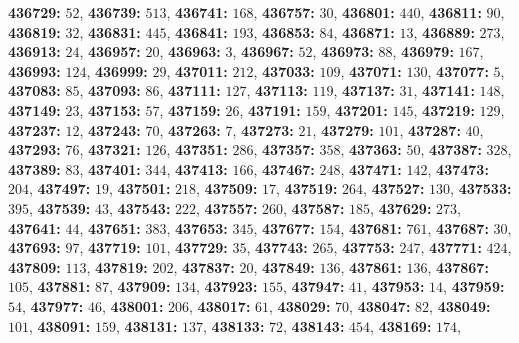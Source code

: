 \textsf{\bfseries 436729:} $52$, \textsf{\bfseries 436739:} $513$, \textsf{\bfseries 436741:} $168$, \textsf{\bfseries 436757:} $30$, \textsf{\bfseries 436801:} $440$, \textsf{\bfseries 436811:} $90$, \textsf{\bfseries 436819:} $32$, \textsf{\bfseries 436831:} $445$, \textsf{\bfseries 436841:} $193$, \textsf{\bfseries 436853:} $84$, \textsf{\bfseries 436871:} $13$, \textsf{\bfseries 436889:} $273$, \textsf{\bfseries 436913:} $24$, \textsf{\bfseries 436957:} $20$, \textsf{\bfseries 436963:} $3$, \textsf{\bfseries 436967:} $52$, \textsf{\bfseries 436973:} $88$, \textsf{\bfseries 436979:} $167$, \textsf{\bfseries 436993:} $124$, \textsf{\bfseries 436999:} $29$, \textsf{\bfseries 437011:} $212$, \textsf{\bfseries 437033:} $109$, \textsf{\bfseries 437071:} $130$, \textsf{\bfseries 437077:} $5$, \textsf{\bfseries 437083:} $85$, \textsf{\bfseries 437093:} $86$, \textsf{\bfseries 437111:} $127$, \textsf{\bfseries 437113:} $119$, \textsf{\bfseries 437137:} $31$, \textsf{\bfseries 437141:} $148$, \textsf{\bfseries 437149:} $23$, \textsf{\bfseries 437153:} $57$, \textsf{\bfseries 437159:} $26$, \textsf{\bfseries 437191:} $159$, \textsf{\bfseries 437201:} $145$, \textsf{\bfseries 437219:} $129$, \textsf{\bfseries 437237:} $12$, \textsf{\bfseries 437243:} $70$, \textsf{\bfseries 437263:} $7$, \textsf{\bfseries 437273:} $21$, \textsf{\bfseries 437279:} $101$, \textsf{\bfseries 437287:} $40$, \textsf{\bfseries 437293:} $76$, \textsf{\bfseries 437321:} $126$, \textsf{\bfseries 437351:} $286$, \textsf{\bfseries 437357:} $358$, \textsf{\bfseries 437363:} $50$, \textsf{\bfseries 437387:} $328$, \textsf{\bfseries 437389:} $83$, \textsf{\bfseries 437401:} $344$, \textsf{\bfseries 437413:} $166$, \textsf{\bfseries 437467:} $248$, \textsf{\bfseries 437471:} $142$, \textsf{\bfseries 437473:} $204$, \textsf{\bfseries 437497:} $19$, \textsf{\bfseries 437501:} $218$, \textsf{\bfseries 437509:} $17$, \textsf{\bfseries 437519:} $264$, \textsf{\bfseries 437527:} $130$, \textsf{\bfseries 437533:} $395$, \textsf{\bfseries 437539:} $43$, \textsf{\bfseries 437543:} $222$, \textsf{\bfseries 437557:} $260$, \textsf{\bfseries 437587:} $185$, \textsf{\bfseries 437629:} $273$, \textsf{\bfseries 437641:} $44$, \textsf{\bfseries 437651:} $383$, \textsf{\bfseries 437653:} $345$, \textsf{\bfseries 437677:} $154$, \textsf{\bfseries 437681:} $761$, \textsf{\bfseries 437687:} $30$, \textsf{\bfseries 437693:} $97$, \textsf{\bfseries 437719:} $101$, \textsf{\bfseries 437729:} $35$, \textsf{\bfseries 437743:} $265$, \textsf{\bfseries 437753:} $247$, \textsf{\bfseries 437771:} $424$, \textsf{\bfseries 437809:} $113$, \textsf{\bfseries 437819:} $202$, \textsf{\bfseries 437837:} $20$, \textsf{\bfseries 437849:} $136$, \textsf{\bfseries 437861:} $136$, \textsf{\bfseries 437867:} $105$, \textsf{\bfseries 437881:} $87$, \textsf{\bfseries 437909:} $134$, \textsf{\bfseries 437923:} $155$, \textsf{\bfseries 437947:} $41$, \textsf{\bfseries 437953:} $14$, \textsf{\bfseries 437959:} $54$, \textsf{\bfseries 437977:} $46$, \textsf{\bfseries 438001:} $206$, \textsf{\bfseries 438017:} $61$, \textsf{\bfseries 438029:} $70$, \textsf{\bfseries 438047:} $82$, \textsf{\bfseries 438049:} $101$, \textsf{\bfseries 438091:} $159$, \textsf{\bfseries 438131:} $137$, \textsf{\bfseries 438133:} $72$, \textsf{\bfseries 438143:} $454$, \textsf{\bfseries 438169:} $174$, 

